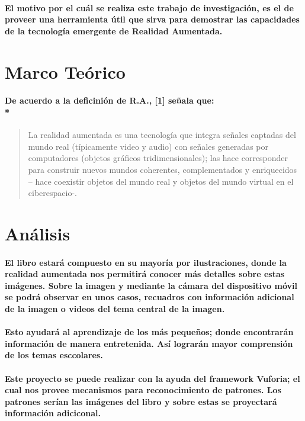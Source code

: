 \documentclass[11pt]{article} %
\begin{document}
\paragraph{
El motivo por el cuál se realiza este trabajo de investigación, es el de proveer una herramienta útil que sirva para demostrar las capacidades de la tecnología emergente de Realidad Aumentada.
 }
\section{Marco Teórico}
\paragraph{
De acuerdo a la deficinión de R.A., [1] señala que:\\*  } \begin{quote} La realidad aumentada es una tecnología que integra señales captadas del mundo real (típicamente video y audio) con señales generadas por computadores (objetos gráficos tridimensionales); las hace corresponder para construir nuevos mundos coherentes, complementados y enriquecidos – hace coexistir objetos del mundo real y objetos del mundo virtual en el ciberespacio-.\end{quote} 

\section{Análisis}
\paragraph{
El libro estará compuesto en su mayoría por ilustraciones, donde la realidad aumentada nos permitirá conocer más detalles sobre estas imágenes.  Sobre la imagen y mediante la cámara del dispositivo móvil se podrá observar en unos casos, recuadros con información adicional de la imagen o videos del tema central de la imagen.
 }
\paragraph{
Esto ayudará al aprendizaje de los más pequeños; donde encontrarán información de manera entretenida.  Así lograrán mayor comprensión de los temas esccolares.
 }
\paragraph{
Este proyecto se puede realizar con la ayuda del framework Vuforia; el cual nos provee mecanismos para reconocimiento de patrones.  Los patrones serían las imágenes del libro y sobre estas se proyectará información adiciconal.
 }
\end{document}
